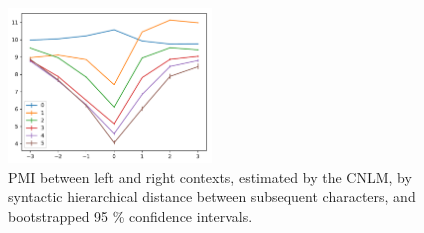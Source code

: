 \begin{figure}
\includegraphics[width=0.48\textwidth]{figures/segmentation-profile-pmis-german-all-heights-ci.pdf}
\caption{PMI between left and right contexts, estimated by the CNLM, by syntactic hierarchical distance between subsequent characters, and bootstrapped 95 \% confidence intervals.}\label{fig:syntax-depth}
\end{figure}





